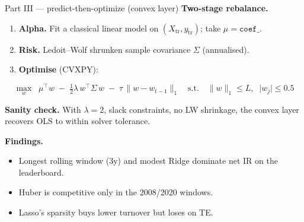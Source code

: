 \documentclass[10pt, aspectratio=169]{beamer}
\begin{document}
\begin{frame}{Part III --- predict-then-optimize (convex layer)}
	\textbf{Two-stage rebalance.}
	\begin{enumerate}
		\item \textbf{Alpha.} Fit a classical linear model on $(X_{\text{tr}}, y_{\text{tr}})$; take $\mu = \texttt{coef\_}$.
		\item \textbf{Risk.} Ledoit--Wolf shrunken sample covariance $\Sigma$ (annualised).
		\item \textbf{Optimise} (CVXPY):
	\end{enumerate}
	\[
		\max_{w} \;\; \mu^{\top} w \;-\; \tfrac{1}{2}\lambda\, w^{\top}\Sigma\, w \;-\; \tau\,\lVert w - w_{t-1}\rVert_1
		\quad \text{s.t.} \quad \lVert w \rVert_1 \le L,\;\; \lvert w_j \rvert \le 0.5
	\]

	\smallskip
	\textbf{Sanity check.} With $\lambda = 2$, slack constraints, no LW shrinkage, the convex layer recovers OLS to within solver tolerance.

	\smallskip
	\textbf{Findings.}
	\begin{itemize}
		\item Longest rolling window (3y) and modest Ridge dominate net IR on the leaderboard.
		\item Huber is competitive only in the 2008/2020 windows.
		\item Lasso's sparsity buys lower turnover but loses on TE.
	\end{itemize}
\end{frame}
\end{document}
